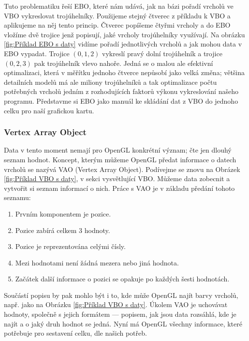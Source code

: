 \documentclass[12pt]{article}
\begin{document}
Tuto problematiku řeší EBO, které nám udává, jak na bázi pořadí vrcholů ve VBO vykreslovat trojúhelníky. Použijeme stejný čtverec z příkladu k VBO a aplikujeme na něj tento princip. Čtverec popíšeme čtyřmi vrcholy a do EBO vložíme dvě trojice jenž popisují, jaké vrcholy trojúhelníky využívají. Na obrázku \ref{fig:Příklad EBO s daty} vidíme pořadí jednotlivých vrcholů a jak mohou data v EBO vypadat. Trojice $(0, 1, 2)$ vykreslí pravý dolní trojúhelník a trojice $(0, 2, 3)$ pak trojúhelník vlevo nahoře. Jedná se o malou ale efektivní optimalizaci, která v měřítku jednoho čtverce nepůsobí jako velká změna; většina detailních modelů má ale miliony trojúhelníků a tak optimalizace počtu potřebných vrcholů jedním z rozhodujících faktorů výkonu vykreslování našeho programu. Představme si EBO jako manuál ke skládání dat z VBO do jednoho celku pro naší grafickou kartu.

\subsubsection{Vertex Array Object}

Data v tento moment nemají pro OpenGL konkrétní význam; čte jen dlouhý seznam hodnot. Koncept, kterým můžeme OpenGL předat informace o datech vrcholů se nazývá VAO (Vertex Array Object). Podívejme se znovu na Obrázek \ref{fig:Příklad VBO s daty}, v sekci vysvětlující VBO. Můžeme data zobecnit a vytvořit si seznam informací o nich. Práce s VAO je v základu předání tohoto seznamu:

\begin{enumerate}
    \item Prvním komponentem je pozice.
    \item Pozice zabírá celkem 3 hodnoty.
    \item Pozice je reprezentována celými čísly.
    \item Mezi hodnotami není žádná mezera nebo jiná hodnota.
    \item Začátek další informace o pozici se opakuje po každých šesti hodnotách.
\end{enumerate}

Součástí popisu by pak mohlo být i to, kde může OpenGL najít barvy vrcholů, např. jako na Obrázku \ref{fig:Příklad VBO s daty}. Úkolem VAO je uchovávat hodnoty, společně s jejich formátem — popisem, jak jsou data rozsáhlá, kde je najít a o jaký druh hodnot se jedná. Nyní má OpenGL všechny informace, které potřebuje pro sestavení celku, dle našich potřeb. \cite{vao_vbo_ebo}
\end{document}
